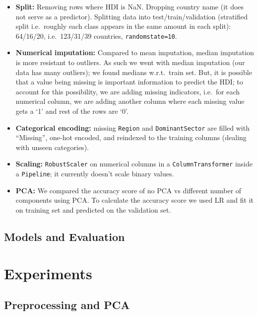 \documentclass[11pt,a4paper]{article}
\renewcommand{\_}{\oldus\allowbreak}
\begin{document}
\begin{itemize}[leftmargin=*]
  \item \textbf{Split:} Removing rows where HDI is NaN. Dropping country
        name (it does not serve as a predictor). Splitting data into
        test/train/validation (stratified split i.e.\ roughly each class
        appears in the same amount in each split): 64/16/20, i.e.\
        123/31/39 countries, \texttt{random\_state=10}.
  \item \textbf{Numerical imputation:} Compared to mean imputation, median
        imputation is more resistant to outliers. As such we went with
        median imputation (our data has many outliers); we found medians
        w.r.t.\ train set. But, it is possible that a value being missing is
        important information to predict the HDI; to account for this
        possibility, we are adding missing indicators, i.e.\ for each
        numerical column, we are adding another column where each missing
        value gets a `1' and rest of the rows are `0'.
  \item \textbf{Categorical encoding:} missing \texttt{Region} and
        \texttt{Dominant\_Sector} are filled with ``Missing'', one-hot
        encoded, and reindexed to the training columns (dealing with unseen
        categories).
  \item \textbf{Scaling:} \texttt{RobustScaler} on numerical columns in a
        \texttt{ColumnTransformer} inside a \texttt{Pipeline}; it currently
        doesn't scale binary values.
  \item \textbf{PCA:} We compared the accuracy score of no PCA vs different
        number of components using PCA. To calculate the accuracy score we
        used LR and fit it on training set and predicted on the validation
        set.
\end{itemize}

\subsection{Models and Evaluation}

\section{Experiments}

\subsection{Preprocessing and PCA}
\end{document}
